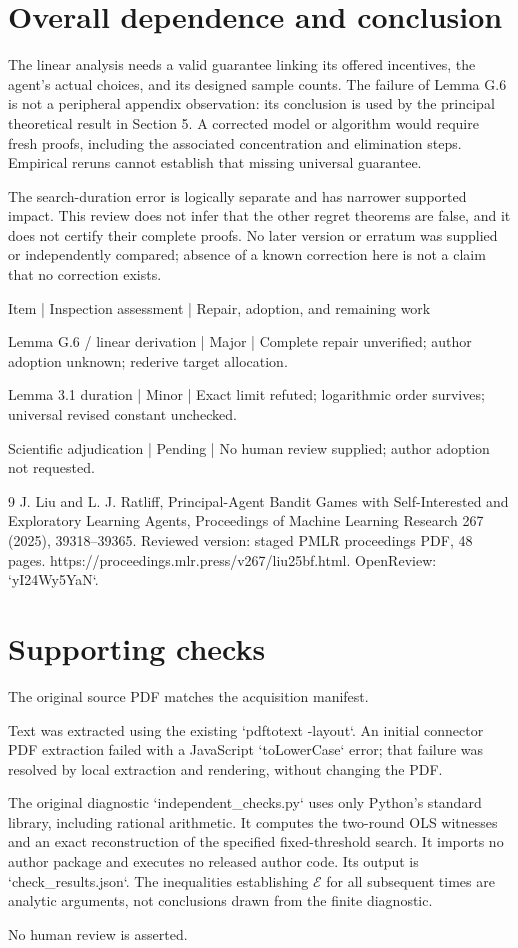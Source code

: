 \documentclass[10pt]{article}
\begin{document}
\section*{Overall dependence and conclusion}
The linear analysis needs a valid guarantee linking its offered incentives, the agent’s actual choices, and its designed sample counts. The failure of Lemma G.6 is not a peripheral appendix observation: its conclusion is used by the principal theoretical result in Section 5. A corrected model or algorithm would require fresh proofs, including the associated concentration and elimination steps. Empirical reruns cannot establish that missing universal guarantee.\par
The search-duration error is logically separate and has narrower supported impact. This review does not infer that the other regret theorems are false, and it does not certify their complete proofs. No later version or erratum was supplied or independently compared; absence of a known correction here is not a claim that no correction exists.\par
Item | Inspection assessment | Repair, adoption, and remaining work\par
Lemma G.6 / linear derivation | Major | Complete repair unverified; author adoption unknown; rederive target allocation.\par
Lemma 3.1 duration | Minor | Exact limit refuted; logarithmic order survives; universal revised constant unchecked.\par
Scientific adjudication | Pending | No human review supplied; author adoption not requested.\par
9 J. Liu and L. J. Ratliff, Principal-Agent Bandit Games with Self-Interested and Exploratory Learning Agents, Proceedings of Machine Learning Research 267 (2025), 39318–39365. Reviewed version: staged PMLR proceedings PDF, 48 pages. https://proceedings.mlr.press/v267/liu25bf.html. OpenReview: `yI24Wy5YaN`.\par
\section*{Supporting checks}
The original source PDF matches the acquisition manifest.\par
Text was extracted using the existing `pdftotext -layout`. An initial connector PDF extraction failed with a JavaScript `toLowerCase` error; that failure was resolved by local extraction and rendering, without changing the PDF.\par
The original diagnostic `independent\_checks.py` uses only Python’s standard library, including rational arithmetic. It computes the two-round OLS witnesses and an exact reconstruction of the specified fixed-threshold search. It imports no author package and executes no released author code. Its output is `check\_results.json`. The inequalities establishing \(\mathcal E\) for all subsequent times are analytic arguments, not conclusions drawn from the finite diagnostic.\par
No human review is asserted.\par
\end{document}

